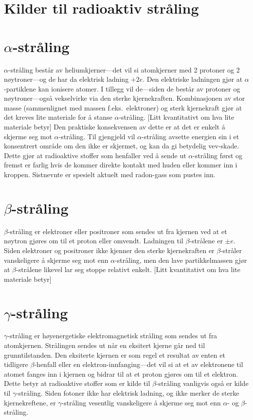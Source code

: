 \section{Kilder til radioaktiv stråling}


\section{$\alpha$-stråling}
$\alpha$-stråling består av heliumkjerner---det vil si atomkjerner med 2 protoner og 2 nøytroner---og de har da elektrisk ladning $+2e$. Den elektriske ladningen gjør at $\alpha$-partiklene kan ionisere atomer. I tillegg vil de---siden de består av protoner og nøytroner---også vekselvirke via den sterke kjernekraften. Kombinasjonen av stor masse (sammenlignet med massen f.eks.~elektroner) og sterk kjernekraft gjør at det kreves lite materiale for å stanse $\alpha$-stråling. {\color{red}[Litt kvantitativt om hva lite materiale betyr]} Den praktiske konsekvensen av dette er at det er enkelt å skjerme seg mot $\alpha$-stråling. Til gjengjeld vil $\alpha$-stråling avsette energien sin i et konsentrert område om den ikke er skjermet, og kan da gi betydelig vev-skade. Dette gjør at radioaktive stoffer som henfaller ved å sende ut $\alpha$-stråling først og fremst er farlig hvis de kommer direkte kontakt med huden eller kommer inn i kroppen. Sistnevnte er spesielt aktuelt med radon-gass som pustes inn.

\section{$\beta$-stråling}
$\beta$-stråling er elektroner eller positroner som sendes ut fra kjernen ved at et nøytron gjøres om til et proton eller omvendt. Ladningen til $\beta$-strålene er $\pm e$. Siden elektroner og positroner ikke kjenner den sterke kjernekraften er $\beta$-stråler vanskeligere å skjerme seg mot enn $\alpha$-stråling, men den lave partikkelmassen gjør at $\beta$-strålene likevel lar seg stoppe relativt enkelt. {\color{red}[Litt kvantitativt om hva lite materiale betyr]}

\section{$\gamma$-stråling}
$\gamma$-stråling er høyenergetiske elektromagnetisk stråling som sendes ut fra atomkjernen. Strålingen sendes ut når en eksitert kjerne går ned til grunntilstanden. Den eksiterte kjernen er som regel et resultat av enten et tidligere $\beta$-henfall eller en elektron-innfanging---det vil si at et av elektronene til atomet fanges inn i kjernen og bidrar til at et proton gjøres om til et elektron. Dette betyr at radioaktive stoffer som er kilde til $\beta$-stråling vanligvis også er kilde til $\gamma$-stråling. Siden fotoner ikke har elektrisk ladning, og ikke merker de sterke kjernekreftene, er $\gamma$-stråling vesentlig vanskeligere å skjerme seg mot enn $\alpha$- og $\beta$-stråling. 

